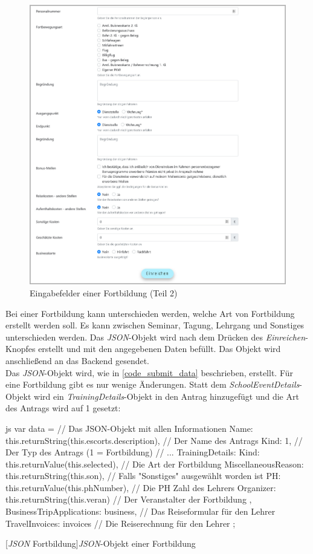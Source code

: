 \begin{figure}[H]
	\centering
	\includegraphics[width=1\linewidth]{images/rfoster_implementierung/workshop2}
	\caption[Fortbildungsinformationen eingeben (Teil 2)]{Eingabefelder einer Fortbildung (Teil 2)}
	\label{fig:workshop2}
\end{figure}
\newpage
Bei einer Fortbildung kann unterschieden werden, welche Art von Fortbildung erstellt werden soll. Es kann zwischen Seminar, Tagung, Lehrgang und Sonstiges unterschieden werden. Das \textit{JSON}-Objekt wird nach dem Drücken des \textit{Einreichen}-Knopfes erstellt und mit den angegebenen Daten befüllt. Das Objekt wird anschließend an das Backend gesendet.\\

Das \textit{JSON}-Objekt wird, wie in \autoref{code_submit_data} beschrieben, erstellt. Für eine Fortbildung gibt es nur wenige Änderungen.
Statt dem \textit{SchoolEventDetails}-Objekt wird ein \textit{TrainingDetails}-Objekt in den Antrag hinzugefügt und die Art des Antrags wird auf 1 gesetzt:
\begin{code}{js}
var data = {		// Das JSON-Objekt mit allen Informationen
	Name: this.returnString(this.escorts.description),	// Der Name des Antrags
	Kind: 1,	// Der Typ des Antrags (1 = Fortbildung)
	// ...
	TrainingDetails: {
		Kind: this.returnValue(this.selected),	// Die Art der Fortbildung
		MiscellaneousReason: this.returnString(this.son),	// Falls "Sonstiges" ausgewählt worden ist
		PH: this.returnValue(this.phNumber),	// Die PH Zahl des Lehrers
		Organizer: this.returnString(this.veran)	// Der Veranstalter der Fortbildung
	},
	BusinessTripApplications: business,	// Das Reiseformular für den Lehrer
	TravelInvoices: invoices	// Die Reiserechnung für den Lehrer
};
\end{code}
[\textit{JSON} Fortbildung]{\textit{JSON}-Objekt einer Fortbildung}~\\
\newpage
